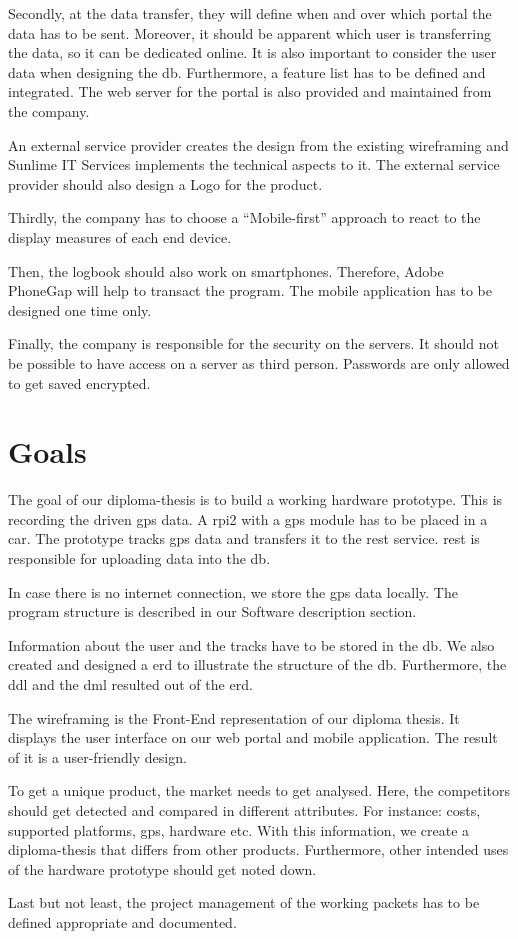 Secondly, at the data transfer, they will define when and over which portal the data has to be sent. Moreover, it should be apparent which user is transferring the data, so it can be dedicated online. It is also important to consider the user data when designing the \gls{db}. Furthermore, a feature list has to be defined and integrated.
The web server for the portal is also provided and maintained from the company.

An external service provider creates the design from the existing wireframing and Sunlime IT Services implements the technical aspects to it. The external service provider should also design a Logo for the product.

Thirdly, the company has to choose a “Mobile-first” approach to react to the display measures of each end device.

Then, the logbook should also work on smartphones. Therefore, Adobe PhoneGap will help to transact the program. The mobile application has to be designed one time only.

Finally, the company is responsible for the security on the servers. It should not be possible to have access on a server as third person. Passwords are only allowed to get saved encrypted.
\newpage
\section*{Goals}
The goal of our diploma-thesis is to build a working hardware prototype. This is recording the driven \gls{gps} data. A \gls{rpi2} with a \gls{gps} module has to be placed in a car. The prototype tracks \gls{gps} data and transfers it to the \gls{rest} service. \gls{rest} is responsible for uploading data into the \gls{db}. 

In case there is no internet connection, we store the \gls{gps} data locally. The program structure is described in our Software description section.

Information about the user and the tracks have to be stored in the \gls{db}. We also created and designed a \gls{erd} to illustrate the structure of the \gls{db}. Furthermore, the \gls{ddl} and the \gls{dml} resulted out of the \gls{erd}.

The wireframing is the Front-End representation of our diploma thesis. It displays the user interface on our web portal and mobile application. The result of it is a user-friendly design.

To get a unique product, the market needs to get analysed. Here, the competitors should get detected and compared in different attributes. For instance: costs, supported platforms, \gls{gps}, hardware etc. With this information, we create a diploma-thesis that differs from other products. Furthermore, other intended uses of the hardware prototype should get noted down.

Last but not least, the project management of the working packets has to be defined appropriate and documented.
